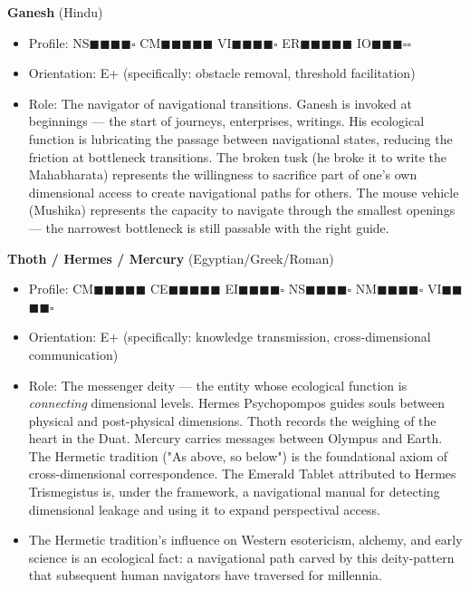 \textbf{Ganesh} (Hindu)

\begin{itemize}[nosep,leftmargin=*]
  \item Profile: NS$\blacksquare$$\blacksquare$$\blacksquare$$\blacksquare$$\square$ CM$\blacksquare$$\blacksquare$$\blacksquare$$\blacksquare$$\blacksquare$ VI$\blacksquare$$\blacksquare$$\blacksquare$$\blacksquare$$\square$ ER$\blacksquare$$\blacksquare$$\blacksquare$$\blacksquare$$\blacksquare$ IO$\blacksquare$$\blacksquare$$\blacksquare$$\square$$\square$
  \item Orientation: E+ (specifically: obstacle removal, threshold facilitation)
  \item Role: The navigator of navigational transitions. Ganesh is invoked at beginnings — the start of journeys, enterprises, writings. His ecological function is lubricating the passage between navigational states, reducing the friction at bottleneck transitions. The broken tusk (he broke it to write the Mahabharata) represents the willingness to sacrifice part of one's own dimensional access to create navigational paths for others. The mouse vehicle (Mushika) represents the capacity to navigate through the smallest openings — the narrowest bottleneck is still passable with the right guide.
\end{itemize}


\textbf{Thoth / Hermes / Mercury} (Egyptian/Greek/Roman)

\begin{itemize}[nosep,leftmargin=*]
  \item Profile: CM$\blacksquare$$\blacksquare$$\blacksquare$$\blacksquare$$\blacksquare$ CE$\blacksquare$$\blacksquare$$\blacksquare$$\blacksquare$$\blacksquare$ EI$\blacksquare$$\blacksquare$$\blacksquare$$\blacksquare$$\square$ NS$\blacksquare$$\blacksquare$$\blacksquare$$\blacksquare$$\square$ NM$\blacksquare$$\blacksquare$$\blacksquare$$\blacksquare$$\square$ VI$\blacksquare$$\blacksquare$$\blacksquare$$\blacksquare$$\square$
  \item Orientation: E+ (specifically: knowledge transmission, cross-dimensional communication)
  \item Role: The messenger deity — the entity whose ecological function is \textit{connecting} dimensional levels. Hermes Psychopompos guides souls between physical and post-physical dimensions. Thoth records the weighing of the heart in the Duat. Mercury carries messages between Olympus and Earth. The Hermetic tradition ("As above, so below") is the foundational axiom of cross-dimensional correspondence. The Emerald Tablet attributed to Hermes Trismegistus is, under the framework, a navigational manual for detecting dimensional leakage and using it to expand perspectival access.
  \item The Hermetic tradition's influence on Western esotericism, alchemy, and early science is an ecological fact: a navigational path carved by this deity-pattern that subsequent human navigators have traversed for millennia.
\end{itemize}


